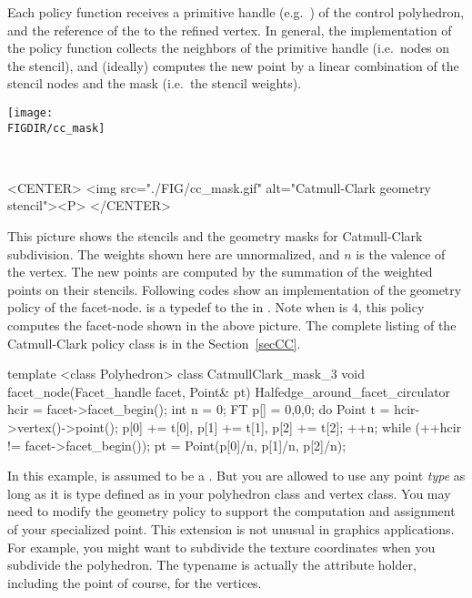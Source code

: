 Each policy function receives a primitive handle 
(e.g.~) of the control polyhedron, 
and the reference of the  to the refined vertex. 
In general, the implementation of the policy function 
collects the neighbors of the primitive handle (i.e.~nodes 
on the stencil), and (ideally) computes the new point 
by a linear combination of the stencil 
nodes and the mask (i.e.~the stencil weights).

\begin{ccTexOnly}
  \begin{center}
    \parbox{0.4\textwidth}{%
      \texttt{[image: \\FIGDIR/cc\_mask]}%
    } \\ \vspace{0.5cm}
  \end{center}
\end{ccTexOnly}
\begin{ccHtmlOnly}
  <CENTER>
     <img src="./FIG/cc_mask.gif" alt="Catmull-Clark geometry stencil"><P>
  </CENTER>
\end{ccHtmlOnly}

This picture shows the stencils and the geometry masks for
Catmull-Clark subdivision. The weights shown here are unnormalized, 
and $n$ is the valence of the vertex. The new points are 
computed by the summation of the weighted points on their stencils.
Following codes show an implementation of the geometry policy of 
the facet-node.  is a typedef to the 
in . Note when  is $4$, this policy computes 
the facet-node shown in the above picture. The complete listing
of the Catmull-Clark policy class is in the Section~\ref{secCC}.

\begin{ccExampleCode}
template <class Polyhedron>
class CatmullClark_mask_3 {
  void facet_node(Facet_handle facet, Point& pt) {
    Halfedge_around_facet_circulator hcir = facet->facet_begin();
    int n = 0;
    FT p[] = {0,0,0};
    do {
      Point t = hcir->vertex()->point();
      p[0] += t[0], p[1] += t[1], p[2] += t[2]; 
      ++n;
    } while (++hcir != facet->facet_begin());
    pt = Point(p[0]/n, p[1]/n, p[2]/n);
  }
}
\end{ccExampleCode}

In this example,  is assumed to be a .
But you are allowed to use any point \emph{type} as long as it is type
defined as  in your polyhedron class and vertex class.
You may need to modify the geometry policy to support the computation
and assignment of your specialized point. This extension is not unusual 
in graphics applications. For example, you might want to subdivide the
texture coordinates when you subdivide the polyhedron. The typename 
 is actually the attribute holder, including the 
point of course, for the vertices.

